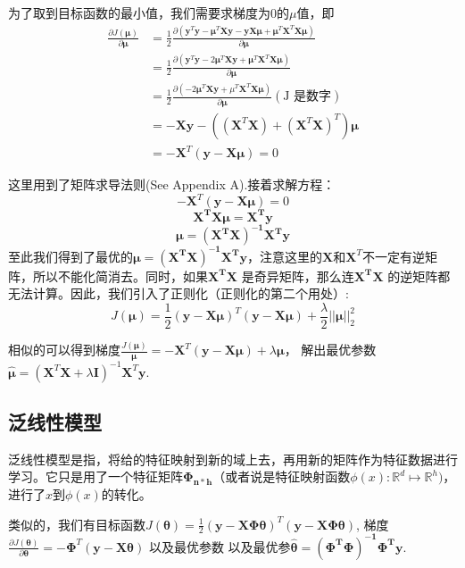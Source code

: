 为了取到目标函数的最小值，我们需要求梯度为$0$的$\mu$值，即
\begin{equation}
\nonumber
  \begin{aligned}
    \frac{\partial J(\mathbf{\mu})}{\partial \mathbf \mu} &
    = \frac{1}{2}\frac{\partial (\mathbf y^T\mathbf y -\mathbf \mu^T\mathbf X\mathbf y - \mathbf y\mathbf X\mathbf \mu +\mathbf \mu^T\mathbf X^T\mathbf X\mathbf \mu)}{\partial \mathbf \mu} \\
    & = \frac{1}{2}\frac{\partial (\mathbf y^T\mathbf y -2\mathbf \mu^T\mathbf X\mathbf y+\mathbf \mu^T\mathbf X^T\mathbf X\mathbf \mu)}{\partial \mathbf \mu} \\
    & = \frac{1}{2} \frac{\partial (-2\mathbf \mu^T\mathbf X\mathbf y+\mu^T\mathbf X^T\mathbf X\mathbf \mu)}{\partial \mathbf \mu} (\text{J 是数字})\\
    & = -\mathbf X\mathbf y - ((\mathbf X^T\mathbf X)+(\mathbf X^T\mathbf X)^T)\mathbf \mu\\
    & = -\mathbf X^T(\mathbf y - \mathbf X\mathbf \mu)  = 0
  \end{aligned}
\end{equation}

这里用到了矩阵求导法则(See Appendix A).接着求解方程：
$$-\mathbf X^T(\mathbf y-\mathbf X\mathbf \mu) = 0$$
$$\mathbf{X^TX\mu} = \mathbf{X^Ty}$$
$$\mathbf \mu =\mathbf{ (X^TX)^{-1}X^Ty}$$
至此我们得到了最优的$\mathbf \mu =\mathbf{ (X^TX)^{-1}X^Ty}$，注意这里的$\mathbf X$和$\mathbf X^T$不一定有逆矩阵，所以不能化简消去。同时，如果$\mathbf{X^TX}$ 是奇异矩阵，那么连$\mathbf{X^TX}$ 的逆矩阵都无法计算。因此，我们引入了正则化（正则化的第二个用处）:
$$J(\mathbf \mu) = \frac{1}{2}(\mathbf y-\mathbf X\mathbf \mu)^T(\mathbf y - \mathbf X\mathbf \mu) + \frac{\lambda}{2}||\mathbf \mu||_2^2 $$

相似的可以得到梯度$\displaystyle \frac{J(\mathbf \mu)}{\mathbf \mu} = -\mathbf X^T(\mathbf y-\mathbf X\mathbf \mu) + \lambda \mathbf \mu$，
解出最优参数$\hat{\mathbf \mu} = (\mathbf X^T\mathbf X+\lambda\mathbf I)^{-1}\mathbf X^T\mathbf y$.

\subsection{泛线性模型}
泛线性模型是指，将给的特征映射到新的域上去，再用新的矩阵作为特征数据进行学习。它只是用了一个特征矩阵$\mathbf{\Phi_{n*h}}$（或者说是特征映射函数$\phi(x):\mathbb R^d \mapsto \mathbb R^h)$，进行了$x$到$\phi(x)$的转化。

类似的，我们有目标函数$J(\mathbf \theta) = \frac{1}{2}(\mathbf y-\mathbf X\mathbf \Phi\mathbf\theta)^T(\mathbf y - \mathbf X\mathbf\Phi\mathbf\theta)$, 梯度$\displaystyle \frac{\partial J(\mathbf \theta)}{\partial \mathbf \theta} = - \mathbf \Phi^T(\mathbf y - \mathbf X\mathbf \theta)$ 以及最优参数
以及最优参$\hat{\mathbf\theta} = \mathbf{(\Phi^T\Phi)^{-1}\Phi^T y}$.


